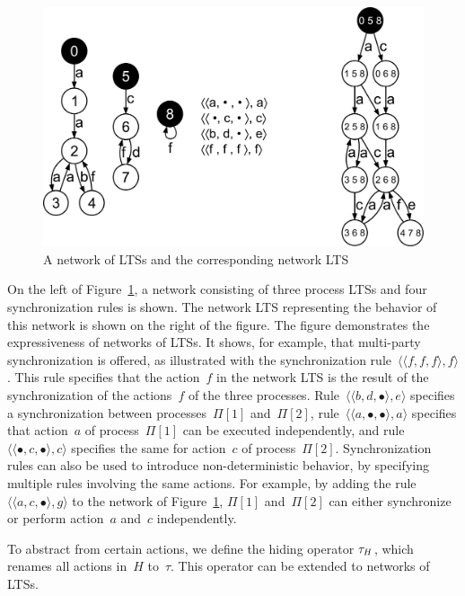 \begin{figure}[hbt]
\centering
\includegraphics[scale=0.2]{lts-transformation/figs/network}
\caption{A network of LTSs and the corresponding network LTS}
\label{fig:lts-transformation:network}
\end{figure}

On the left of Figure~\ref{fig:lts-transformation:network}, a network consisting of three process LTSs and four synchronization rules is shown.
The network LTS representing the behavior of this network is shown on the right of the figure.
The figure demonstrates the expressiveness of networks of LTSs.
It shows, for example, that multi-party synchronization is offered, as illustrated with the synchronization rule~$\langle\langle f, f, f\rangle, f\rangle$.
This rule specifies that the action~$f$ in the network LTS is the result of the synchronization of the actions~$f$ of the three processes.
Rule~$\langle\langle b, d, \bullet \rangle, e\rangle$ specifies a synchronization between processes~$\Pi[1]$ and~$\Pi[2]$, rule~$\langle\langle a, \bullet, \bullet \rangle, a \rangle$ specifies that action~$a$ of process~$\Pi[1]$ can be executed independently, and rule~$\langle\langle \bullet, c, \bullet \rangle, c \rangle$ specifies the same for action~$c$ of process~$\Pi[2]$.
Synchronization rules can also be used to introduce non-deterministic behavior, by specifying multiple rules involving the same actions.
For example, by adding the rule~$\langle\langle a, c, \bullet \rangle, g \rangle$ to the network of Figure~\ref{fig:lts-transformation:network}, $\Pi[1]$ and~$\Pi[2]$ can either synchronize or perform action~$a$ and~$c$ independently.

To abstract from certain actions, we define the hiding operator $\tau_H$, which renames all actions in~$H$ to~$\tau$.
This operator can be extended to networks of LTSs.

